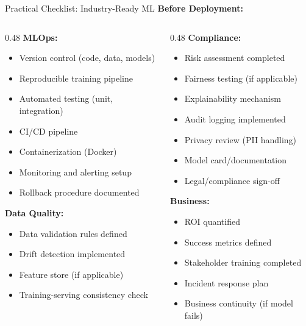 \begin{frame}{Practical Checklist: Industry-Ready ML}
\textbf{Before Deployment:}

\begin{columns}
\begin{column}{0.48\textwidth}
\textbf{MLOps:}
\begin{itemize}
\item[$\square$] Version control (code, data, models)
\item[$\square$] Reproducible training pipeline
\item[$\square$] Automated testing (unit, integration)
\item[$\square$] CI/CD pipeline
\item[$\square$] Containerization (Docker)
\item[$\square$] Monitoring and alerting setup
\item[$\square$] Rollback procedure documented
\end{itemize}

\vspace{0.2cm}
\textbf{Data Quality:}
\begin{itemize}
\item[$\square$] Data validation rules defined
\item[$\square$] Drift detection implemented
\item[$\square$] Feature store (if applicable)
\item[$\square$] Training-serving consistency check
\end{itemize}
\end{column}

\begin{column}{0.48\textwidth}
\textbf{Compliance:}
\begin{itemize}
\item[$\square$] Risk assessment completed
\item[$\square$] Fairness testing (if applicable)
\item[$\square$] Explainability mechanism
\item[$\square$] Audit logging implemented
\item[$\square$] Privacy review (PII handling)
\item[$\square$] Model card/documentation
\item[$\square$] Legal/compliance sign-off
\end{itemize}

\vspace{0.2cm}
\textbf{Business:}
\begin{itemize}
\item[$\square$] ROI quantified
\item[$\square$] Success metrics defined
\item[$\square$] Stakeholder training completed
\item[$\square$] Incident response plan
\item[$\square$] Business continuity (if model fails)
\end{itemize}
\end{column}
\end{columns}


\end{frame}
